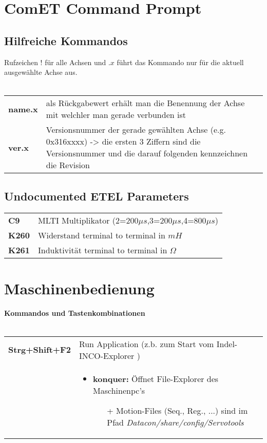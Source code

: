 \section{ComET Command Prompt}
	\subsection{Hilfreiche Kommandos}
		Rufzeichen $ ! $ für alle Achsen und $ .x $ führt das Kommando nur für die aktuell ausgewählte Achse aus.\\\\
		\begin{tabular}{l|p{14cm}}
			\rowcolor{gray!10!white}
			\textbf{name.x} & als Rückgabewert erhält man die Benennung der Achse mit welchler man gerade verbunden ist \\ \rowcolor{gray!10!white}	
			\textbf{ver.x} & Versionsnummer der gerade gewählten Achse (e.g. 0x316xxxx) -> die ersten 3 Ziffern sind die Versionsnummer und die darauf folgenden kennzeichnen die Revision \\	
		\end{tabular}
	\subsection{Undocumented ETEL Parameters}
		\begin{tabular}{l|p{14cm}}
			\rowcolor{gray!10!white}
			\textbf{C9} & MLTI Multiplikator (2=200$ \mu s $,3=200$ \mu s $,4=800$ \mu s $) \\ 	
			\textbf{K260} & Widerstand terminal to terminal in $ mH $\\	
			\rowcolor{gray!10!white}
			\textbf{K261} & Induktivität terminal to terminal in $ \Omega $\\	
		\end{tabular}
\section{Maschinenbedienung}
\textbf{Kommandos und Tastenkombinationen\\\\}
\begin{tabular}{l|p{14cm}}
	\rowcolor{gray!10!white}
	\textbf{Strg+Shift+F2} & Run Application (z.b. zum Start vom Indel-INCO-Explorer )\\
	\rowcolor{gray!10!white}
	& \begin{itemize}
		\item \textbf{konquer:} Öffnet File-Explorer des Maschinenpc's
		\begin{itemize}
			\item[+] Motion-Files (Seq., Reg., ...) sind im Pfad \textit{Datacon/share/config/Servotools}
		\end{itemize}	
	\end{itemize}	
\end{tabular}

